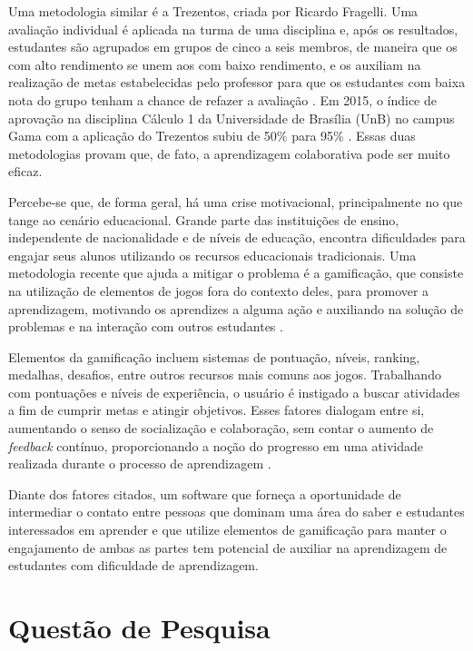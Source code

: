 Uma metodologia similar é a Trezentos, criada por Ricardo Fragelli. Uma avaliação individual é aplicada na turma de uma disciplina e, após os resultados, estudantes são agrupados em grupos de cinco a seis membros, de maneira que os com alto rendimento se unem aos com baixo rendimento, e os auxiliam na realização de metas estabelecidas pelo professor para que os estudantes com baixa nota do grupo tenham a chance de refazer a avaliação \cite{trezentos}. Em 2015, o índice de aprovação na disciplina Cálculo 1 da Universidade de Brasília (UnB) no campus Gama com a aplicação do Trezentos  subiu de 50\% para 95\% \cite{trezentosResultados}. Essas duas metodologias provam que, de fato, a aprendizagem colaborativa pode ser muito eficaz.

Percebe-se que, de forma geral, há uma crise motivacional, principalmente no que tange ao cenário educacional. Grande parte das instituições de ensino, independente de nacionalidade e de níveis de educação, encontra dificuldades para engajar seus alunos utilizando os recursos educacionais tradicionais. Uma metodologia recente que ajuda a mitigar o problema é a gamificação, que consiste na utilização de elementos de jogos fora do contexto deles, para promover a aprendizagem, motivando os aprendizes a alguma ação e auxiliando na solução de problemas e na interação com outros estudantes  \cite{tolomei2017gamificaccao}.

Elementos da gamificação incluem sistemas de pontuação, níveis, ranking, medalhas, desafios, entre outros recursos mais comuns aos jogos. Trabalhando com pontuações e níveis de experiência, o usuário é instigado a buscar atividades a fim de cumprir metas e atingir objetivos. Esses fatores dialogam entre si, aumentando o senso de socialização e colaboração, sem contar o aumento de \textit{feedback} contínuo, proporcionando a noção do progresso em uma atividade realizada durante o processo de aprendizagem \cite{tolomei2017gamificaccao}.

Diante dos fatores citados, um software que forneça a oportunidade de intermediar o contato entre pessoas que dominam uma área do saber e estudantes interessados em aprender e que utilize elementos de gamificação para manter o engajamento de ambas as partes tem potencial de auxiliar na aprendizagem de estudantes com dificuldade de aprendizagem.


\section[Questão de Pesquisa]{Questão de Pesquisa}
\label{sec:questao}

